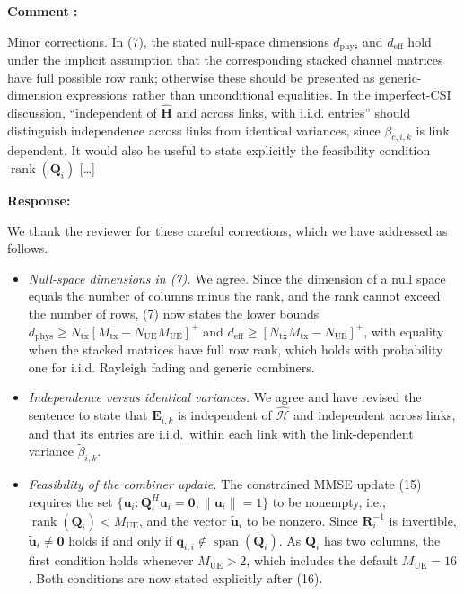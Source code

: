 \documentclass[a4paper,12pt]{article}
\newcounter{reviewcomment}
\newenvironment{reviewcomment}{%
  \stepcounter{reviewcomment}%
  \begin{shaded}
  \textbf{Comment \thereviewcomment:}\par
}{\end{shaded}}
\newenvironment{response}{\par\textbf{Response:}\par}{\par}
\begin{document}
\begin{reviewcomment}
Minor corrections. In (7), the stated null-space dimensions
$d_{\mathrm{phys}}$ and $d_{\mathrm{eff}}$ hold under the implicit assumption
that the corresponding stacked channel matrices have full possible row rank;
otherwise these should be presented as generic-dimension expressions rather
than unconditional equalities. In the imperfect-CSI discussion,
``independent of $\hat{\mathbf H}$ and across links, with i.i.d. entries''
should distinguish independence across links from identical variances,
since $\beta_{e,i,k}$ is link dependent. It would also be useful to state
explicitly the feasibility condition $\operatorname{rank}(\mathbf{Q}_i)$
[\ldots]
\end{reviewcomment}
\begin{response}
We thank the reviewer for these careful corrections, which we have
addressed as follows.
\begin{itemize}
  \item \emph{Null-space dimensions in (7).} We agree. Since the dimension of
  a null space equals the number of columns minus the rank, and the rank
  cannot exceed the number of rows, (7) now states the lower bounds
  $d_{\mathrm{phys}}\ge N_{\mathrm{tx}}[M_{\mathrm{tx}}-N_{\mathrm{UE}}M_{\mathrm{UE}}]^+$
  and $d_{\mathrm{eff}}\ge[N_{\mathrm{tx}}M_{\mathrm{tx}}-N_{\mathrm{UE}}]^+$,
  with equality when the stacked matrices have full row rank, which holds
  with probability one for i.i.d. Rayleigh fading and generic combiners.
  \item \emph{Independence versus identical variances.} We agree and have
  revised the sentence to state that $\mathbf{E}_{i,k}$ is independent of
  $\widehat{\mathcal{H}}$ and independent across links, and that its entries
  are i.i.d.\ within each link with the link-dependent variance
  $\widetilde{\beta}_{i,k}$.
  \item \emph{Feasibility of the combiner update.} The constrained MMSE
  update (15) requires the set $\{\mathbf{u}_i:\mathbf{Q}_i^H\mathbf{u}_i=\mathbf{0},
  \|\mathbf{u}_i\|=1\}$ to be nonempty, i.e.,
  $\operatorname{rank}(\mathbf{Q}_i)<M_{\mathrm{UE}}$, and the vector
  $\widetilde{\mathbf{u}}_i$ to be nonzero. Since $\mathbf{R}_i^{-1}$ is
  invertible, $\widetilde{\mathbf{u}}_i\neq\mathbf{0}$ holds if and only if
  $\mathbf{q}_{i,i}\notin\operatorname{span}(\mathbf{Q}_i)$. As
  $\mathbf{Q}_i$ has two columns, the first condition holds whenever
  $M_{\mathrm{UE}}>2$, which includes the default $M_{\mathrm{UE}}=16$. Both
  conditions are now stated explicitly after (16).
\end{itemize}
\end{response}
\end{document}
